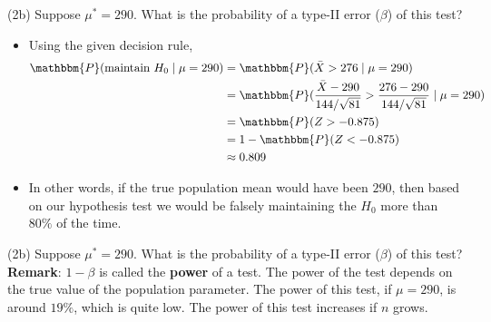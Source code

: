 \documentclass[
  11pt,
  ignorenonframetext,
]{beamer}
\providecommand{\tightlist}{%
  \setlength{\itemsep}{0pt}\setlength{\parskip}{0pt}}
\begin{document}
\begin{frame}{(2b) Suppose \(\mu^* = 290\). \hspace{9cm} What is the
probability of a type-II error (\(\beta\)) of this test?}
\protect\hypertarget{b-suppose-mu-290.-what-is-the-probability-of-a-type-ii-error-beta-of-this-test-1}{}
\begin{itemize}
\tightlist
\item
  Using the given decision rule, \[
  \begin{aligned}
  \mathbbm{P}(\text{maintain } H_0 \mid \mu = 290) &= \mathbbm{P}(\bar{X} > 276\mid \mu = 290)\\
  &= \mathbbm{P}(\frac{\bar{X}-290}{144/\sqrt{81}} > \frac{276-290}{144/\sqrt{81}}\mid \mu = 290)\\
  &= \mathbbm{P}(Z> -0.875)\\
  &= 1 - \mathbbm{P}(Z< -0.875)\\
  &\approx 0.809
  \end{aligned}
  \]
\item
  In other words, if the true population mean would have been \(290\),
  then based on our hypothesis test we would be falsely maintaining the
  \(H_0\) more than \(80\%\) of the time.
\end{itemize}
\end{frame}

\begin{frame}{(2b) Suppose \(\mu^* = 290\). \hspace{9cm} What is the
probability of a type-II error (\(\beta\)) of this test?}
\protect\hypertarget{b-suppose-mu-290.-what-is-the-probability-of-a-type-ii-error-beta-of-this-test-2}{}
\textbf{Remark}: \(1-\beta\) is called the \textbf{power} of a test. The
power of the test depends on the true value of the population parameter.
The power of this test, if \(\mu = 290\), is around \(19\%\), which is
quite low. The power of this test increases if \(n\) grows.
\end{frame}
\end{document}
